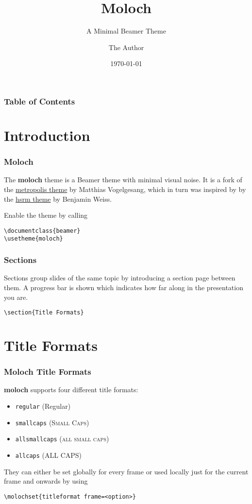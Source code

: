 \documentclass[10pt]{beamer}
\title{Moloch}
\subtitle{A Minimal Beamer Theme}
\date{\today}
\author{The Author}
\institute{Some Institution, Some University}
\newcommand{\themename}{\textbf{moloch}\xspace}
\begin{document}
\maketitle

\begin{frame}
\frametitle{Table of Contents}
  \tableofcontents[hideallsubsections]
\end{frame}

\section{Introduction}

\begin{frame}[fragile]
\frametitle{Moloch}

  The \themename theme is a Beamer theme with minimal visual noise. It is a fork of the
  \href{https://github.com/matze/mtheme}{metropolis theme} by Matthias Vogelgesang, which in
  turn was inspired by by the \href{https://github.com/hsrmbeamertheme/hsrmbeamertheme}{hsrm
    theme} by Benjamin Weiss. \medskip

  Enable the theme by calling
  \begin{verbatim}\documentclass{beamer}
\usetheme{moloch}\end{verbatim}
\end{frame}
\begin{frame}[fragile]
\frametitle{Sections}
  Sections group slides of the same topic by introducing a section page between them. A progress bar is shown which indicates how far along in the presentation you are.

  \begin{verbatim}\section{Title Formats}\end{verbatim}
\end{frame}

\section{Title Formats}

\begin{frame}[fragile]
\frametitle{Moloch Title Formats}
  \themename supports four different title formats:
  \begin{itemize}
    \item \texttt{regular} (Regular)
    \item \texttt{smallcaps} (\textsc{Small Caps})
    \item \texttt{allsmallcaps} (\textsc{all small caps})
    \item \texttt{allcaps} (ALL CAPS)
  \end{itemize}

  They can either be set globally for every frame or used locally just for the current frame
  and onwards by using
  \begin{verbatim}\molochset{titleformat frame=<option>}\end{verbatim}
\end{frame}
\end{document}
